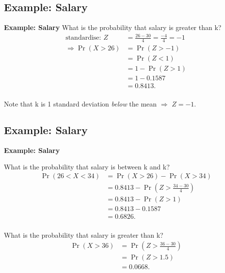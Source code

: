 \documentclass[compress]{beamer}        %
\makeatletter
\newcommand{\tcb}{\textcolor{beamer@blendedblue}}
\makeatother
\begin{document}
\subsection{Example: Salary}
\begin{frame}{\bf \tcb{Example: Salary}}
What is the probability that salary is greater than k?
\begin{align*}
\text{standardise: } Z &= \frac{26-30}{4} = \frac{-4}{4} = -1\\[0.4cm]
\Rightarrow \Pr(X > 26) &= \Pr(Z > -1)\\[0.1cm]
&= \Pr(Z < 1)\\[0.1cm]
&= 1 - \Pr(Z > 1)\\[0.1cm]
&= 1 - 0.1587\\[0.1cm]
&=  0.8413.\\[-0.2cm]
\end{align*}

Note that k is 1 standard deviation \emph{below} the mean $\Rightarrow$ $Z = -1$.

\end{frame}


\subsection{Example: Salary}
\begin{frame}{\bf \tcb{Example: Salary}}\label{normexampletab}

What is the probability that salary is between k and k?
\begin{align*}
\Pr(26 < X < 34) &= \Pr(X > 26) - \Pr(X > 34) \\[0.1cm]
&= 0.8413 - \Pr(Z > \tfrac{34-30}{4}) \\[0.1cm]
&= 0.8413 - \Pr(Z > 1) \\[0.1cm]
&= 0.8413 - 0.1587 \\[0.1cm]
&= 0.6826.\\
\end{align*}

What is the probability that salary is greater than k?
\begin{align*}
\Pr(X > 36) &= \Pr(Z > \tfrac{36-30}{4}) \\[0.1cm]
&= \Pr(Z > 1.5) \\[0.1cm]
&= 0.0668.
\end{align*}

\end{frame}
\end{document}
